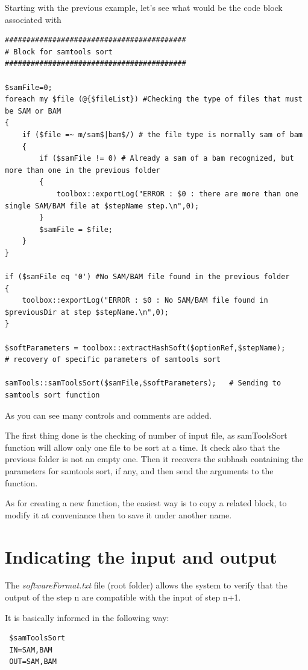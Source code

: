 \documentclass[a4paper,10pt]{report}
\begin{document}
Starting with the previous example, let's see what would be the code block associated with

\begin{lstlisting}
##########################################
# Block for samtools sort
##########################################

$samFile=0;
foreach my $file (@{$fileList}) #Checking the type of files that must be SAM or BAM
{
    if ($file =~ m/sam$|bam$/) # the file type is normally sam of bam
    {
        if ($samFile != 0) # Already a sam of a bam recognized, but more than one in the previous folder
        {
            toolbox::exportLog("ERROR : $0 : there are more than one single SAM/BAM file at $stepName step.\n",0);
        }
        $samFile = $file;
    }
}

if ($samFile eq '0') #No SAM/BAM file found in the previous folder
{
    toolbox::exportLog("ERROR : $0 : No SAM/BAM file found in $previousDir at step $stepName.\n",0);
}

$softParameters = toolbox::extractHashSoft($optionRef,$stepName);     # recovery of specific parameters of samtools sort

samTools::samToolsSort($samFile,$softParameters);   # Sending to samtools sort function
\end{lstlisting}

As you can see many controls and comments are added.

The first thing done is the checking of number of input file, as samToolsSort function will allow only one file to be sort at a time. It check also that the previous folder is not an empty one.
Then it recovers the subhash containing the parameters for samtools sort, if any, and then send the arguments to the function.

As for creating a new function, the easiest way is to copy a related block, to modify it at conveniance then to save it under another name.

\section{Indicating the input and output}

The \emph{softwareFormat.txt} file (root folder) allows the system to verify that the output of the step n are compatible with the input of step n+1.

It is basically informed in the following way:

\begin{verbatim}
 $samToolsSort
 IN=SAM,BAM
 OUT=SAM,BAM
\end{verbatim}
\end{document}
